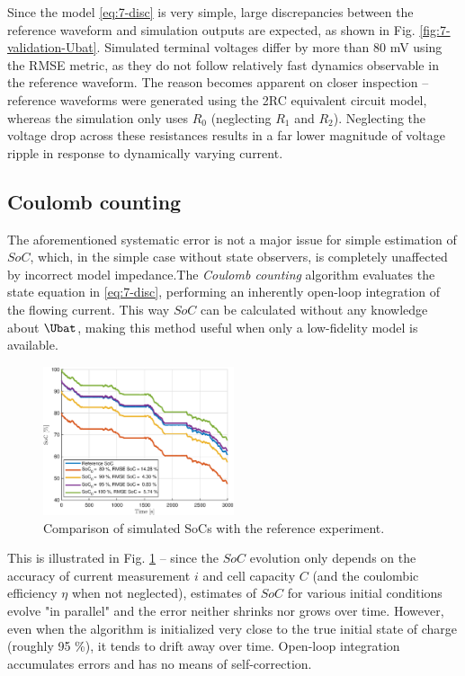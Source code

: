 Since the model \eqref{eq:7-disc} is very simple, large discrepancies between the reference waveform and simulation outputs are expected, as shown in Fig. \ref{fig:7-validation-Ubat}. Simulated terminal voltages differ by more than 80 mV using the RMSE metric, as they do not follow relatively fast dynamics observable in the reference waveform. The reason becomes apparent on closer inspection -- reference waveforms were generated using the 2RC equivalent circuit model, whereas the simulation only uses $R_0$ (neglecting $R_1$ and $R_2$). Neglecting the voltage drop across these resistances results in a far lower magnitude of voltage ripple in response to dynamically varying current.

\subsection{Coulomb counting}
\label{sec:7-cc}

The aforementioned systematic error is not a major issue for simple estimation of $SoC$, which, in the simple case without state observers, is completely unaffected by incorrect model impedance.The \textit{Coulomb counting} algorithm evaluates the state equation in \eqref{eq:7-disc}, performing an inherently open-loop integration of the flowing current. This way $SoC$ can be calculated without any knowledge about $\Ubat$, making this method useful when only a low-fidelity model is available.

\begin{figure}[bp]
    \centering
    \includegraphics[width=0.5\textwidth]{figures/7/validation-SOC.eps}
    \caption{Comparison of simulated SoCs with the reference experiment.}
    \label{fig:7-validation-SOC}
\end{figure}

This is illustrated in Fig. \ref{fig:7-validation-SOC} -- since the $SoC$ evolution only depends on the accuracy of current measurement $i$ and cell capacity $C$ (and the coulombic efficiency $\eta$ when not neglected), estimates of $SoC$ for various initial conditions evolve "in parallel" and the error neither shrinks nor grows over time. However, even when the algorithm is initialized very close to the true initial state of charge (roughly 95 \%), it tends to drift away over time. Open-loop integration accumulates errors and has no means of self-correction.







